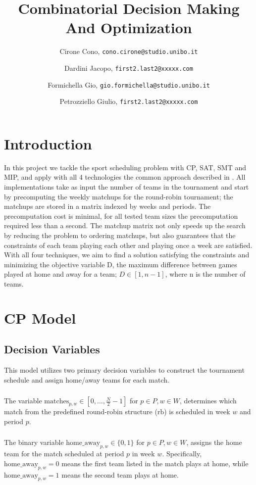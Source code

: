 \documentclass{article}
\title{Combinatorial Decision Making And Optimization}
\author{
  Cirone Cono, \texttt{cono.cirone@studio.unibo.it}
  \and
  Dardini Jacopo, \texttt{first2.last2@xxxxx.com}
  \and
  Formichella Gio, \texttt{gio.formichella@studio.unibo.it}
  \and
  Petrozziello Giulio, \texttt{first2.last2@xxxxx.com}
}
\date{}
\begin{document}
\maketitle

\section{Introduction}
In this project we tackle the sport scheduling problem with CP, SAT, SMT and MIP, and apply with all 4 technologies the common approach described in \cite{10.1007/10704567_6}. All implementations take as input the number of teams in the tournament and start by precomputing the weekly matchups for the round-robin tournament; the matchups are stored in a matrix indexed by weeks and periods. The precomputation cost is minimal, for all tested team sizes the precomputation required less than a second. The matchup matrix not only speeds up the search by reducing the problem to ordering matchups, but also guarantees that the constraints of each team playing each other and playing once a week are satisfied. With all four techniques, we aim to find a solution satisfying the constraints and minimizing the objective variable D, the maximum difference between games played at home and away for a team; $D\in [1, n-1]$, where n is the number of teams. 

\section{CP Model}
\subsection{Decision Variables}
This model utilizes two primary decision variables to construct the tournament schedule and assign home/away teams for each match.

\subsubsection{}
The variable $\text{matches}_{p, w} \in [0, \dots, \frac{N}{2} - 1]$ for $p \in P, w \in W$, determines which match from the predefined round-robin structure ($\text{rb}$) is scheduled in week $w$ and period $p$.

\subsubsection{}
The binary variable $\text{home\_away}_{p, w} \in \{0, 1\}$ for $p \in P, w \in W$, assigns the home team for the match scheduled at period $p$ in week $w$. Specifically, $\text{home\_away}_{p, w} = 0$ means the first team listed in the match plays at home, while $\text{home\_away}_{p, w} = 1$ means the second team plays at home.
\end{document}

